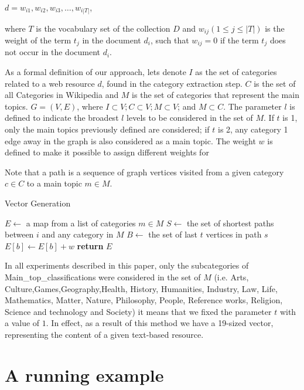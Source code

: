 $d={w_{i1},w_{i2},w_{i3},\ldots,w_{i|T|}}$,

where $T$ is the vocabulary set of the collection $D$ and $w_{ij} (1 \le j \le |T|)$ is the weight of the term $t_j$ in the document $d_i$, such that $w_{ij} = 0$ if the term $t_j$ does not occur in the document $d_i$.

As a formal definition of our approach, lets denote $I$ as the set of categories related to a web resource $d$, found in the category extraction step. $C$ is the set of all Categories in Wikipedia and $M$ is the set of categories that represent the main topics. $G = (V,E)$, where $I \subset V ; C \subset V ; M \subset V$; and $M \subset C$.  The parameter  $l$ is defined to indicate the broadest $l$ levels to be considered in the set of $M$. If $t$ is 1, only the main topics previously defined are considered; if $t$ is 2, any category 1 edge away in the graph is also considered as a main topic. The weight $w$ is defined to make it possible to assign different weights for 

Note that a path is a sequence of graph vertices visited from a given category $c \in C$ to a main topic $m \in M$.  

\begin{algorithm}
\caption{Vector Generation}\label{alg:fingerprint}
\label{alg:fingerprint-generation}
\begin{algorithmic}[1]
\State $E\gets$ a map from a list of categories $ m \in M$
\State $S\gets$ the set of shortest paths between $i$ and any category in $M$
\State $B\gets$ the set of last $t$ vertices in path $s$
\State $E[b]\gets E[b] + w$
\EndFor
\EndFor
\EndFor
\State \textbf{return} $E$
\EndProcedure
\end{algorithmic}
\end{algorithm}


In all experiments described in this paper, only the subcategories of Main\_top\_classifications were considered in the set of  $M$ (i.e. Arts, Culture,Games,Geography,Health, History, Humanities, Industry, Law, Life, Mathematics, Matter, Nature, Philosophy, People, Reference works, Religion, Science and technology and Society) it means that we fixed the parameter $t$ with a value of $1$. In effect, as a result of this method we have a 19-sized vector, representing the content of a given text-based resource.

\section{\hspace*{3pt} A running example}

